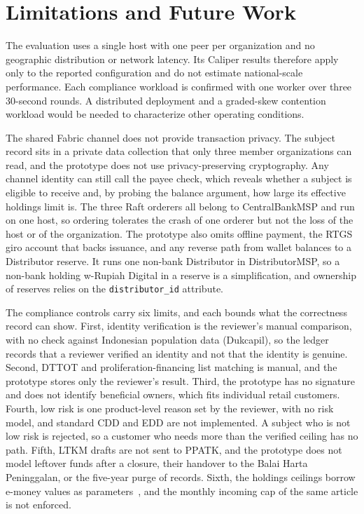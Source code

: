 \documentclass[conference]{IEEEtran}
\begin{document}
\section{Limitations and Future Work}
\label{sec:limits}
The evaluation uses a single host with one peer per organization and no
geographic distribution or network latency. Its Caliper results therefore apply
only to the reported configuration and do not estimate national-scale
performance. Each compliance workload is confirmed with one worker over three
30-second rounds. A distributed deployment and a graded-skew contention workload
would be needed to characterize other operating conditions.

The shared Fabric channel does not provide transaction privacy. The subject record
sits in a private data collection that only three member organizations can read, and
the prototype does not use privacy-preserving cryptography. Any channel identity can
still call the payee check, which reveals whether a subject is eligible to receive and,
by probing the balance argument, how large its effective holdings limit is. The three
Raft orderers all belong to CentralBankMSP and run on one host, so ordering tolerates
the crash of one orderer but not the loss of the host or of the organization. The
prototype also omits offline payment, the RTGS giro account that backs issuance,
and any reverse path from wallet balances to a Distributor reserve. It runs one
non-bank Distributor in DistributorMSP, so a non-bank holding w-Rupiah Digital in a
reserve is a simplification, and ownership of reserves relies on the
\texttt{distributor\_id} attribute.

The compliance controls carry six limits, and each bounds what the correctness record
can show. First, identity verification is the reviewer's manual comparison, with no
check against Indonesian population data (Dukcapil), so the ledger records that a
reviewer verified an identity and not that the identity is genuine. Second, DTTOT and
proliferation-financing list matching is manual, and the prototype stores only the
reviewer's result. Third, the prototype has no signature and does not identify
beneficial owners, which fits individual retail customers. Fourth, low risk is one
product-level reason set by the reviewer, with no risk model, and standard CDD and EDD
are not implemented. A subject who is not low risk is rejected, so a customer who
needs more than the verified ceiling has no path. Fifth, LTKM drafts are not sent to
PPATK, and the prototype does not model leftover funds after a closure, their handover
to the Balai Harta Peninggalan, or the five-year purge of records. Sixth, the holdings
ceilings borrow e-money values as parameters~\cite{bi2025padg32}, and the monthly
incoming cap of the same article is not enforced.
\end{document}
